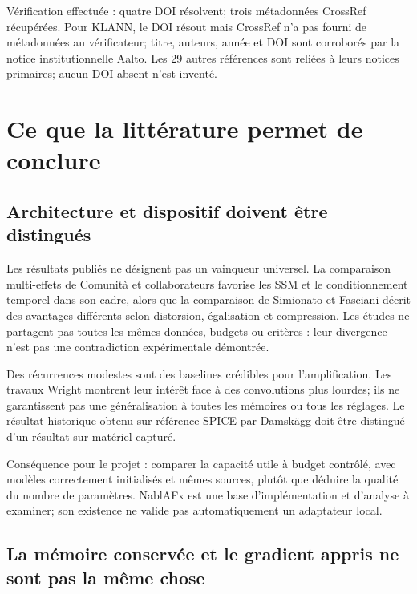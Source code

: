 \documentclass[10pt,a4paper]{article}
\begin{document}
V\'{e}rification effectu\'{e}e : quatre DOI r\'{e}solvent; trois m\'{e}tadonn\'{e}es CrossRef r\'{e}cup\'{e}r\'{e}es.
Pour KLANN, le DOI r\'{e}sout mais CrossRef n'a pas fourni de m\'{e}tadonn\'{e}es au v\'{e}rificateur;
titre, auteurs, ann\'{e}e et DOI sont corrobor\'{e}s par la notice institutionnelle Aalto.
Les 29 autres r\'{e}f\'{e}rences sont reli\'{e}es \`{a} leurs notices primaires; aucun DOI absent n'est invent\'{e}.

\section{Ce que la litt\'{e}rature permet de conclure}

\subsection{Architecture et dispositif doivent \^{e}tre distingu\'{e}s}

Les r\'{e}sultats publi\'{e}s ne d\'{e}signent pas un vainqueur universel. La comparaison multi-effets de
Comunit\`{a} et collaborateurs favorise les SSM et le conditionnement temporel dans son cadre,
alors que la comparaison de Simionato et Fasciani d\'{e}crit des avantages diff\'{e}rents selon
distorsion, \'{e}galisation et compression. Les \'{e}tudes ne partagent pas toutes les m\^{e}mes donn\'{e}es,
budgets ou crit\`{e}res : leur divergence n'est pas une contradiction exp\'{e}rimentale d\'{e}montr\'{e}e.
\cite{comunita2025,simionato2024a}

Des r\'{e}currences modestes sont des baselines cr\'{e}dibles pour l'amplification. Les travaux Wright
montrent leur int\'{e}r\^{e}t face \`{a} des convolutions plus lourdes; ils ne garantissent pas une
g\'{e}n\'{e}ralisation \`{a} toutes les m\'{e}moires ou tous les r\'{e}glages. Le r\'{e}sultat historique obtenu sur
r\'{e}f\'{e}rence SPICE par Damsk\"{a}gg doit \^{e}tre distingu\'{e} d'un r\'{e}sultat sur mat\'{e}riel captur\'{e}.
\cite{wright2019,wright2020,damskagg2018}

Cons\'{e}quence pour le projet : comparer la capacit\'{e} utile \`{a} budget contr\^{o}l\'{e}, avec mod\`{e}les
correctement initialis\'{e}s et m\^{e}mes sources, plut\^{o}t que d\'{e}duire la qualit\'{e} du nombre de param\`{e}tres.
NablAFx est une base d'impl\'{e}mentation et d'analyse \`{a} examiner; son existence ne valide pas
automatiquement un adaptateur local. \cite{nablafx2025}

\subsection{La m\'{e}moire conserv\'{e}e et le gradient appris ne sont pas la m\^{e}me chose}
\end{document}
